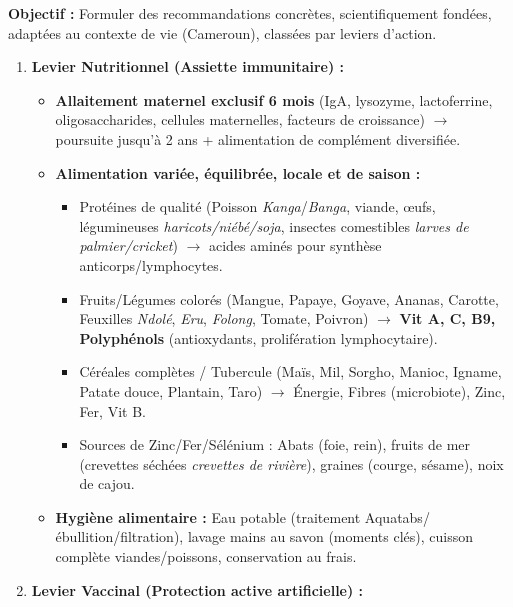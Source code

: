 \documentclass[11pt]{article}
\begin{document}
\begin{methode}
    \textbf{Objectif :} Formuler des recommandations concrètes, scientifiquement fondées, adaptées au contexte de vie (Cameroun), classées par leviers d'action.
    \begin{enumerate}
        \item \textbf{Levier Nutritionnel (Assiette immunitaire) :}
        \begin{itemize}
            \item \textbf{Allaitement maternel exclusif 6 mois} (IgA, lysozyme, lactoferrine, oligosaccharides, cellules maternelles, facteurs de croissance) $\rightarrow$ poursuite jusqu'à 2 ans + alimentation de complément diversifiée.
            \item \textbf{Alimentation variée, équilibrée, locale et de saison :} 
                \begin{itemize}
                    \item Protéines de qualité (Poisson \emph{Kanga}/\emph{Banga}, viande, œufs, légumineuses \emph{haricots/niébé/soja}, insectes comestibles \emph{larves de palmier/cricket}) $\rightarrow$ acides aminés pour synthèse anticorps/lymphocytes.
                    \item Fruits/Légumes colorés (Mangue, Papaye, Goyave, Ananas, Carotte, Feuxilles \emph{Ndolé}, \emph{Eru}, \emph{Folong}, Tomate, Poivron) $\rightarrow$ \textbf{Vit A, C, B9, Polyphénols} (antioxydants, prolifération lymphocytaire).
                    \item Céréales complètes / Tubercule (Maïs, Mil, Sorgho, Manioc, Igname, Patate douce, Plantain, Taro) $\rightarrow$ Énergie, Fibres (microbiote), Zinc, Fer, Vit B.
                    \item Sources de Zinc/Fer/Sélénium : Abats (foie, rein), fruits de mer (crevettes séchées \emph{crevettes de rivière}), graines (courge, sésame), noix de cajou.
                \end{itemize}
            \item \textbf{Hygiène alimentaire :} Eau potable (traitement Aquatabs/ébullition/filtration), lavage mains au savon (moments clés), cuisson complète viandes/poissons, conservation au frais.
        \end{itemize}
        \item \textbf{Levier Vaccinal (Protection active artificielle) :}
        \begin{itemize}

\end{itemize}
\end{enumerate}
\end{methode}
\end{document}

